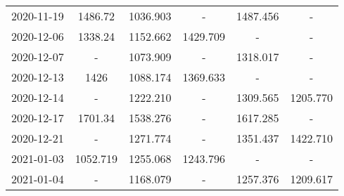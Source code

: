 \begin{table*}[t]
\begin{tabular}{cccccc}
2020-11-19 &                         1486.72 &  {\cellcolor{blue!25} 1036.903} &                   - &        1487.456 &                               - \\
2020-12-06 &                         1338.24 &  {\cellcolor{blue!25} 1152.662} &            1429.709 &               - &                               - \\
2020-12-07 &                               - &  {\cellcolor{blue!25} 1073.909} &                   - &        1318.017 &                               - \\
2020-12-13 &                            1426 &  {\cellcolor{blue!25} 1088.174} &            1369.633 &               - &                               - \\
2020-12-14 &                               - &                        1222.210 &                   - &        1309.565 &  {\cellcolor{blue!25} 1205.770} \\
2020-12-17 &                         1701.34 &  {\cellcolor{blue!25} 1538.276} &                   - &        1617.285 &                               - \\
2020-12-21 &                               - &  {\cellcolor{blue!25} 1271.774} &                   - &        1351.437 &                        1422.710 \\
2021-01-03 &  {\cellcolor{blue!25} 1052.719} &                        1255.068 &            1243.796 &               - &                               - \\
2021-01-04 &                               - &  {\cellcolor{blue!25} 1168.079} &                   - &        1257.376 &                        1209.617 \\
\bottomrule
\end{tabular}

\end{table*}